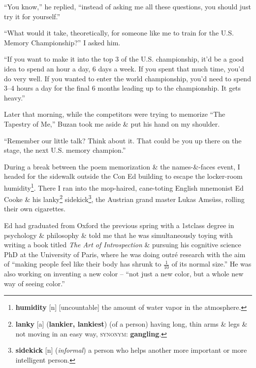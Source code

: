 \documentclass[oneside]{book}
\numberwithin{equation}{section}
\begin{document}
``You know,'' he replied, ``instead of asking me all these questions, you should just try it for yourself.''

``What would it take, theoretically, for someone like me to train for the U.S. Memory Championship?'' I asked him.

``If you want to make it into the top 3 of the U.S. championship, it'd be a good idea to spend an hour a day, 6 days a week. If you spent that much time, you'd do very well. If you wanted to enter the world championship, you'd need to spend 3--4 hours a day for the final 6 months leading up to the championship. It gets heavy.''

Later that morning, while the competitors were trying to memorize ``The Tapestry of Me,'' Buzan took me aside \& put his hand on my shoulder.

``Remember our little talk? Think about it. That could be you up there on the stage, the next U.S. memory champion.''

During a break between the poem memorization \& the names-\&-faces event, I headed for the sidewalk outside the Con Ed building to escape the locker-room humidity\footnote{\textbf{humidity} [n] [uncountable] the amount of water vapor in the atmosphere.}. There I ran into the mop-haired, cane-toting English mnemonist Ed Cooke \& his lanky\footnote{\textbf{lanky} [a] (\textbf{lankier, lankiest}) (of a person) having long, thin arms \& legs \& not moving in an easy way, \textsc{synonym}: \textbf{gangling}.} sidekick\footnote{\textbf{sidekick} [n] (\textit{informal}) a person who helps another more important or more intelligent person.}, the Austrian grand master Lukas Ams\"uss, rolling their own cigarettes.

Ed had graduated from Oxford the previous spring with a 1stclass degree in psychology \& philosophy \& told me that he was simultaneously toying with writing a book titled \textit{The Art of Introspection} \& pursuing his cognitive science PhD at the University of Paris, where he was doing outr\'e research with the aim of ``making people feel like their body has shrunk to $\frac{1}{10}$ of its normal size.'' He was also working on inventing a new color -- ``not just a new color, but a whole new way of seeing color.''
\end{document}
